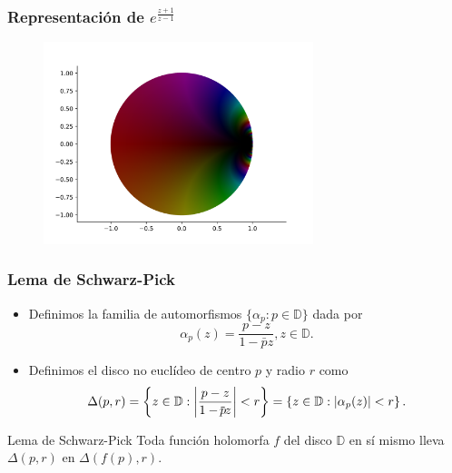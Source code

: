 \documentclass[spanish, a4paper, 12pt, final, slideColor, nototal, colorBG, pdf, noaccumulate, darkblue]{beamer}
\providecommand{\abs}[1]{\left\lvert#1\right\rvert}
\newcommand*\xbar[1]{%
   \hbox{%
     \vbox{%
       \hrule height 0.5pt %
       \kern0.2ex%
       \hbox{%
         \kern-0.1em%
         \ensuremath{#1}%
         \kern-0.1em%
       }%
     }%
   }%
}
\newcommand{\disk}{\mathbb{D}}
\begin{document}
\begin{frame}
    \frametitle{Representación de $e^{\frac{z+1}{z-1}}$}
    \begin{figure}[!htbp]
        \centering
        \includegraphics[width=0.7\textwidth]{../Aplicacion/e^((z+1):(z-1)).png}
        \label{fig:e^((z+1)/(z-1))}
    \end{figure}
\end{frame}

\begin{frame}
    \frametitle{Lema de Schwarz-Pick}
    \begin{itemize}
        \item Definimos la familia de automorfismos $\{\alpha_p: p\in \disk\}$ dada por
            \begin{equation*}
                \alpha_p (z) = \frac{p-z}{1 - \bar{p}z}, z \in \disk.
            \end{equation*}

        \item Definimos el disco no euclídeo de centro $p$ y radio $r$ como
            \begin{equation*}
                \Delta(p,r) = \left\{z \in \disk: \abs{\frac{p-z}{1 - \xbar{p}z}} < r\right\} = \left\{z \in \disk: \abs{\alpha_p(z)} < r \right\}.
            \end{equation*}

    \end{itemize}

    \begin{block}{Lema de Schwarz-Pick}
        Toda función holomorfa $f$ del disco $\disk$ en sí mismo lleva $\Delta(p,r)$ en $\Delta(f(p),r)$.
    \end{block}
\end{frame}
\end{document}
